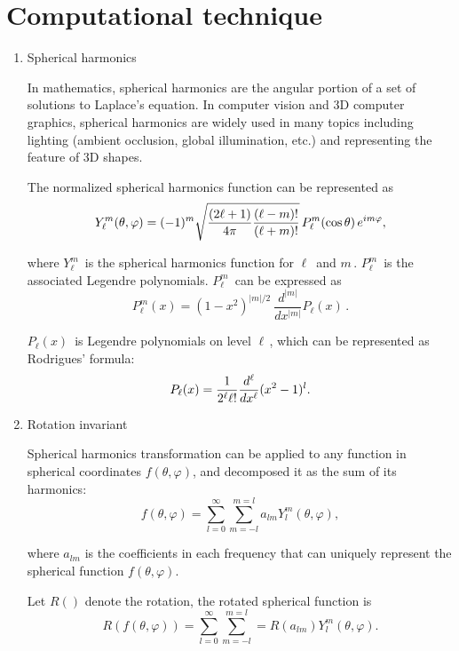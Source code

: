 \section{Computational technique}
\begin{enumerate}
\item Spherical harmonics

In mathematics, spherical harmonics are the angular portion of a set of solutions to Laplace's equation. In computer vision and 3D computer graphics, spherical harmonics are widely used in many topics including lighting (ambient occlusion, global illumination, etc.) and representing the feature of 3D shapes.

The normalized spherical harmonics function can be represented as 
\begin{equation} \label{spherical_harmonics}
    Y_\ell^m( \theta , \varphi ) = (-1)^m \sqrt{{(2\ell+1)\over 4\pi}{(\ell-m)!\over (\ell+m)!}} \, P_\ell^m ( \cos{\theta} ) \, e^{i m \varphi },
\end{equation}

where $Y_\ell^m\,\!$ is the spherical harmonics function for $\ell\,\!$ and $m\,\!$. $P_\ell^m\,\!$ is the associated Legendre polynomials. $P_\ell^m\,\!$ can be expressed as 
\begin{equation} \label{legendre}
P_\ell^m(x) = (1 - x^2)^{|m|/2}\ \frac{d^{|m|}}{dx^{|m|}}P_\ell(x)\, .
\end{equation}

$P_\ell(x)\,\!$ is Legendre polynomials on level $\ell\,\!$, which can be represented as Rodrigues' formula:
\begin{equation} \label{rodrigues}
P_\ell(x) = {1 \over 2^\ell \ell!} {d^\ell\over dx^\ell }(x^2 - 1)^l.
\end{equation}

\item Rotation invariant

Spherical harmonics transformation can be applied to any function in spherical coordinates $f(\theta,\varphi)$, and decomposed it as the sum of its harmonics:
\begin{equation} \label{sphericalfunction}
f(\theta,\varphi)=\sum_{l=0}^{\infty}\sum_{m=-l}^{m=l}a_{lm}Y_{l}^{m}(\theta,\varphi),
\end{equation}

where $a_{lm}$ is the coefficients in each frequency that can uniquely represent the spherical function $f(\theta,\varphi)$. 

Let $R()$ denote the rotation, the rotated spherical function is
\begin{equation} \label{rotatedfunction}
R(f(\theta,\varphi))=\sum_{l=0}^{\infty}\sum_{m=-l}^{m=l}=R(a_{lm})Y_{l}^{m}(\theta,\varphi).
\end{equation}


\end{enumerate}
